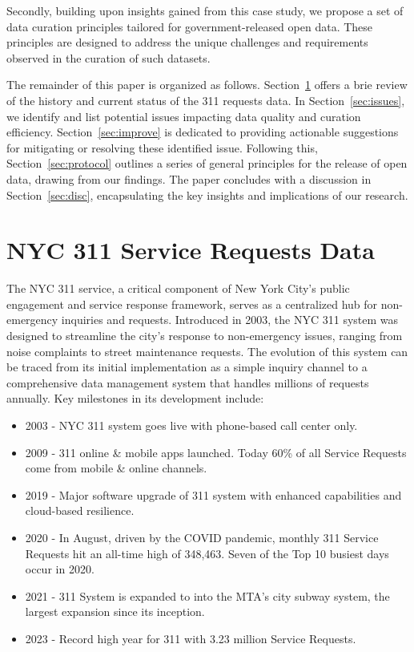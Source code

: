 \documentclass[12pt, titlepage]{article}
\begin{document}
Secondly, building upon insights gained from this case study, we 
propose a set of data curation principles tailored for government-released open data. 
These principles are designed to address the unique challenges 
and requirements observed in the curation of such datasets.

The remainder of this paper is organized as follows. 
Section~\ref{sec:data} offers a brie review of the 
history and current status of the 311 requests data. In 
Section~\ref{sec:issues}, we identify and list potential issues 
impacting data quality and curation efficiency. 
Section~\ref{sec:improve} is dedicated to providing 
actionable suggestions for mitigating or resolving these identified issue. 
Following this, Section~\ref{sec:protocol} outlines a series of general 
principles for the release of open data, drawing from our findings. 
The paper concludes with a discussion in Section~\ref{sec:disc}, encapsulating 
the key insights and implications of our research.


\section{NYC 311 Service Requests Data} \label{sec:data}

The NYC 311 service, a critical component of New York City's public
engagement and service response framework, serves as a centralized hub
for non-emergency inquiries and requests. Introduced in 2003, the NYC
311 system was designed to streamline the city's response to
non-emergency issues, ranging from noise complaints to street
maintenance requests. The evolution of this system can be traced from
its initial implementation as a simple inquiry channel to a
comprehensive data management system that handles millions of requests
annually. Key milestones in its development include:

\begin{itemize}
 	\item 2003 - NYC 311 system  goes live with phone-based call center only.
   	\item 2009 - 311 online \& mobile apps launched. Today 60\% of all Service Requests come from mobile \& online channels.
   	\item 2019 - Major software upgrade of 311 system with enhanced capabilities and cloud-based resilience. 	
      	\item 2020 - In August, driven by the COVID pandemic, monthly 311 Service Requests hit an all-time high of 348,463. Seven of the Top 10 busiest days occur in 2020.
      	\item 2021 - 311 System is expanded to into the MTA's city subway system, the largest expansion since its inception.
   	\item 2023 - Record high year for 311 with 3.23 million Service Requests.
\end{itemize}
\end{document}
